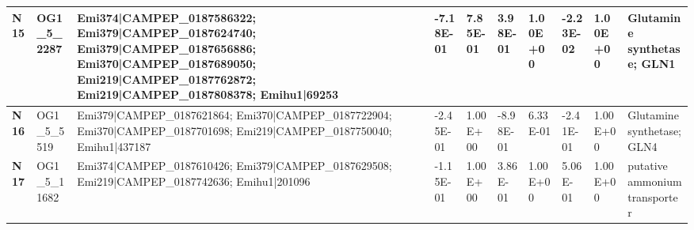 \begin{landscape}
\begin{center}
\begin{footnotesize}
\begin{longtable}{|p{0.5cm}|p{1.5cm}|p{4cm}|l|l|l|l|l|l|l|}
\textbf{N15} & OG1\_5\_2287  & Emi374|CAMPEP\_0187586322; Emi379|CAMPEP\_0187624740; Emi379|CAMPEP\_0187656886; Emi370|CAMPEP\_0187689050; Emi219|CAMPEP\_0187762872; Emi219|CAMPEP\_0187808378; Emihu1|69253                                                                                                                                                                                                                                                                                                                                                                                                                                                           & -7.18E-01 & 7.85E-01 & 3.98E-01  & 1.00E+00 & -2.23E-02 & 1.00E+00 & Glutamine synthetase; GLN1                                                   \\ \hline
\textbf{N16} & OG1\_5\_5519  & Emi379|CAMPEP\_0187621864; Emi370|CAMPEP\_0187722904; Emi370|CAMPEP\_0187701698; Emi219|CAMPEP\_0187750040; Emihu1|437187                                                                                                                                                                                                                                                                                                                                                                                                                                                                                                                & -2.45E-01 & 1.00E+00 & -8.98E-01 & 6.33E-01 & -2.41E-01 & 1.00E+00 & Glutamine synthetase; GLN4                                                   \\ \hline
\textbf{N17} & OG1\_5\_11682 & Emi374|CAMPEP\_0187610426; Emi379|CAMPEP\_0187629508; Emi219|CAMPEP\_0187742636; Emihu1|201096                                                                                                                                                                                                                                                                                                                                                                                                                                                                                                                                           & -1.15E-01 & 1.00E+00 & 3.86E-01  & 1.00E+00 & 5.06E-01  & 1.00E+00 & putative ammonium transporter                                                \\ \hline

\end{longtable}
\end{footnotesize}
\end{center}
\end{landscape}
